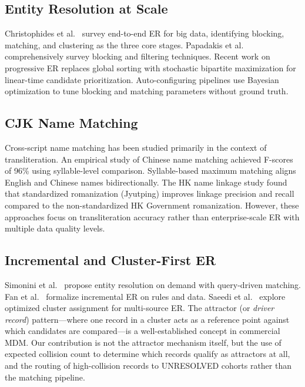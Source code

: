 \documentclass{article}
\begin{document}
\subsection{Entity Resolution at Scale}

Christophides et al.\ \cite{christophides2020overview} survey end-to-end ER for big data, identifying blocking, matching, and clustering as the three core stages. Papadakis et al.\ \cite{papadakis2020blocking} comprehensively survey blocking and filtering techniques. Recent work on progressive ER \cite{karapiperis2025sper} replaces global sorting with stochastic bipartite maximization for linear-time candidate prioritization. Auto-configuring pipelines \cite{nikoletos2025autoer} use Bayesian optimization to tune blocking and matching parameters without ground truth.

\subsection{CJK Name Matching}

Cross-script name matching has been studied primarily in the context of transliteration. An empirical study of Chinese name matching \cite{aclnamematching2015} achieved F-scores of 96\% using syllable-level comparison. Syllable-based maximum matching \cite{yeh2011syllable} aligns English and Chinese names bidirectionally. The HK name linkage study \cite{strojny2025hknames} found that standardized romanization (Jyutping) improves linkage precision and recall compared to the non-standardized HK Government romanization. However, these approaches focus on transliteration accuracy rather than enterprise-scale ER with multiple data quality levels.

\subsection{Incremental and Cluster-First ER}

Simonini et al.\ \cite{simonini2022ondemand} propose entity resolution on demand with query-driven matching. Fan et al.\ \cite{fan2013incremental} formalize incremental ER on rules and data. Saeedi et al.\ \cite{saeedi2020incremental} explore optimized cluster assignment for multi-source ER. The attractor (or \emph{driver record}) pattern—where one record in a cluster acts as a reference point against which candidates are compared—is a well-established concept in commercial MDM. Our contribution is not the attractor mechanism itself, but the use of expected collision count to determine which records qualify as attractors at all, and the routing of high-collision records to UNRESOLVED cohorts rather than the matching pipeline.
\end{document}
